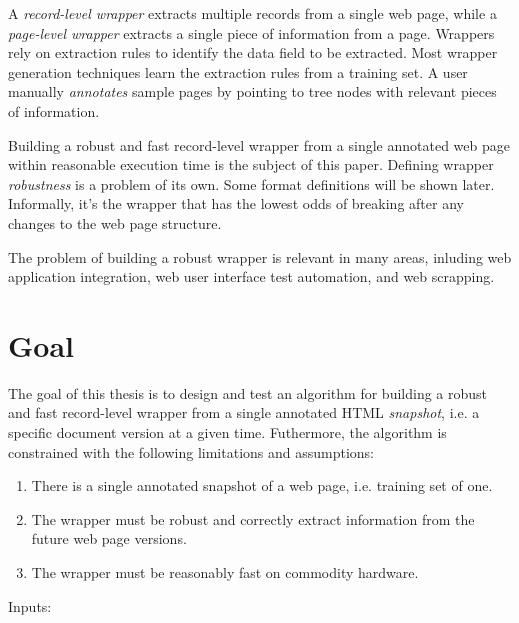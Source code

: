 A \emph{record-level wrapper} extracts multiple records from a single web page, while a \emph{page-level wrapper} extracts a single piece of information from a page. Wrappers rely on extraction rules to identify the data field to be extracted. Most wrapper generation techniques learn the extraction rules from a training set. A user manually \emph{annotates} sample pages by pointing to tree nodes with relevant pieces of information.

Building a robust and fast record-level wrapper from a single annotated web page within reasonable execution time is the subject of this paper. Defining wrapper \emph{robustness} is a problem of its own. Some format definitions will be shown later. Informally, it's the wrapper that has the lowest odds of breaking after any changes to the web page structure.

The problem of building a robust wrapper is relevant in many areas, inluding web application integration, web user interface test automation, and web scrapping.


\section{Goal}


The goal of this thesis is to design and test an algorithm for building a robust and fast record-level wrapper from a single annotated HTML \emph{snapshot}, i.e. a specific document version at a given time. Futhermore, the algorithm is constrained with the following limitations and assumptions:

\begin{enumerate}
	\item There is a single annotated snapshot of a web page, i.e. training set of one.
	\item The wrapper must be robust and correctly extract information from the future web page versions.
	\item The wrapper must be reasonably fast on commodity hardware.
\end{enumerate}

Inputs: 

